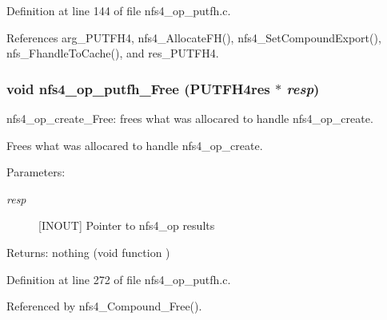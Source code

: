 Definition at line 144 of file nfs4\_\-op\_\-putfh.c.

References arg\_\-PUTFH4, nfs4\_\-Allocate\-FH(), nfs4\_\-Set\-Compound\-Export(), nfs\_\-Fhandle\-To\-Cache(), and res\_\-PUTFH4.
\subsubsection{\setlength{\rightskip}{0pt plus 5cm}void nfs4\_\-op\_\-putfh\_\-Free (PUTFH4res $\ast$ {\em resp})}\label{nfs4__op__putfh_8c_a3}


nfs4\_\-op\_\-create\_\-Free: frees what was allocared to handle nfs4\_\-op\_\-create.

Frees what was allocared to handle nfs4\_\-op\_\-create.

\begin{Desc}
\item[Parameters:]
\begin{description}
\item[{\em resp}][INOUT] Pointer to nfs4\_\-op results\end{description}
\end{Desc}
\begin{Desc}
\item[Returns:]nothing (void function ) \end{Desc}


Definition at line 272 of file nfs4\_\-op\_\-putfh.c.

Referenced by nfs4\_\-Compound\_\-Free().